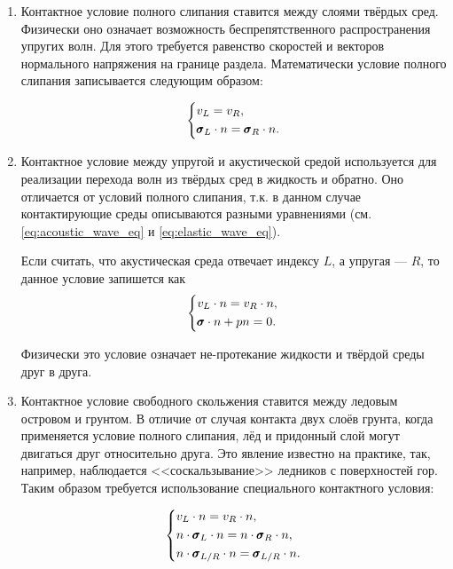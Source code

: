 \begin{enumerate}
    \item Контактное условие полного слипания ставится между слоями твёрдых сред. Физически оно означает возможность беспрепятственного распространения упругих волн. Для этого требуется равенство скоростей и векторов нормального напряжения на границе раздела. Математически условие полного слипания записывается следующим образом:
    
    \begin{equation*}
    \begin{dcases}
        v_L = v_R ,\\
        \pmb{\sigma}_L \cdot n = \pmb{\sigma}_R \cdot n .
    \end{dcases}
    \end{equation*}
    
    \item Контактное условие между упругой и акустической средой используется для реализации перехода волн из твёрдых сред в жидкость и обратно. Оно отличается от условий полного слипания, т.к. в данном случае контактирующие среды описываются разными уравнениями (см. \eqref{eq:acoustic_wave_eq} и  \eqref{eq:elastic_wave_eq}).
    
    Если считать, что акустическая среда отвечает индексу $L$, а упругая --- $R$, то данное условие запишется как
    \begin{equation*}
    \begin{dcases}
        v_L \cdot n = v_R \cdot n , \\
        \pmb{\sigma} \cdot n + p n = 0 .
    \end{dcases}
    \end{equation*}
    
    Физически это условие означает не-протекание жидкости и твёрдой среды друг в друга.
    
    \item Контактное условие свободного скольжения ставится между ледовым островом и грунтом. В отличие от случая контакта двух слоёв грунта, когда применяется условие полного слипания, лёд и придонный слой могут двигаться друг относительно друга. Это явление известно на практике, так, например, наблюдается <<соскальзывание>> ледников с поверхностей гор. Таким образом требуется использование специального контактного условия:
    
    \begin{equation*}
    \begin{dcases}
        v_L \cdot n = v_R \cdot n , \\
        n \cdot \pmb{\sigma}_L \cdot n = n \cdot \pmb{\sigma}_R \cdot n, \\
        n \cdot \pmb{\sigma}_{L/R} \cdot n = \pmb{\sigma}_{L/R} \cdot n .
    \end{dcases}
    \end{equation*}
    

\end{enumerate}
